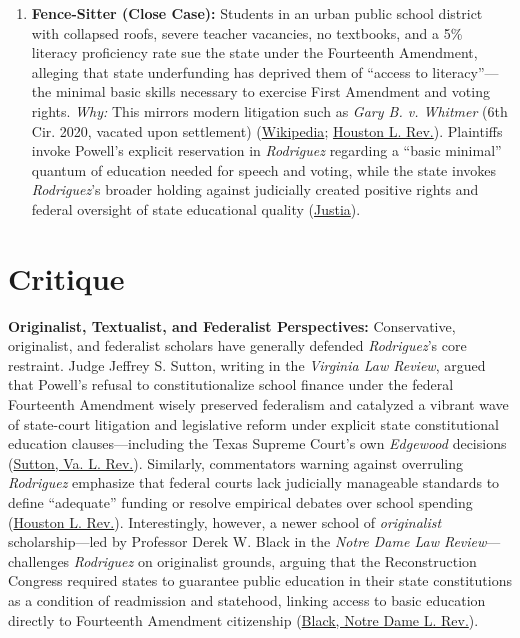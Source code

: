 \documentclass[12pt]{article}
\begin{document}
\begin{enumerate}
\item \textbf{Fence-Sitter (Close Case):} Students in an urban public school district with collapsed roofs, severe teacher vacancies, no textbooks, and a 5\% literacy proficiency rate sue the state under the Fourteenth Amendment, alleging that state underfunding has deprived them of ``access to literacy''---the minimal basic skills necessary to exercise First Amendment and voting rights. \emph{Why:} This mirrors modern litigation such as \textit{Gary B. v. Whitmer} (6th Cir. 2020, vacated upon settlement) (\href{https://en.wikipedia.org/wiki/San_Antonio_Independent_School_District_v._Rodriguez}{Wikipedia}; \href{https://houstonlawreview.org/article/18015-reversing-_rodriguez_-a-siren-call-to-a-dangerous-shoal}{Houston L. Rev.}). Plaintiffs invoke Powell's explicit reservation in \textit{Rodriguez} regarding a ``basic minimal'' quantum of education needed for speech and voting, while the state invokes \textit{Rodriguez}'s broader holding against judicially created positive rights and federal oversight of state educational quality (\href{https://supreme.justia.com/cases/federal/us/411/1/}{Justia}).
\end{enumerate}

\section{Critique}

\textbf{Originalist, Textualist, and Federalist Perspectives:} Conservative, originalist, and federalist scholars have generally defended \textit{Rodriguez}'s core restraint. Judge Jeffrey S. Sutton, writing in the \textit{Virginia Law Review}, argued that Powell's refusal to constitutionalize school finance under the federal Fourteenth Amendment wisely preserved federalism and catalyzed a vibrant wave of state-court litigation and legislative reform under explicit state constitutional education clauses---including the Texas Supreme Court's own \textit{Edgewood} decisions (\href{https://www.virginialawreview.org/wp-content/uploads/2020/12/1963-1.pdf}{Sutton, Va. L. Rev.}). Similarly, commentators warning against overruling \textit{Rodriguez} emphasize that federal courts lack judicially manageable standards to define ``adequate'' funding or resolve empirical debates over school spending (\href{https://houstonlawreview.org/article/18015-reversing-_rodriguez_-a-siren-call-to-a-dangerous-shoal}{Houston L. Rev.}). Interestingly, however, a newer school of \emph{originalist} scholarship---led by Professor Derek W. Black in the \textit{Notre Dame Law Review}---challenges \textit{Rodriguez} on originalist grounds, arguing that the Reconstruction Congress required states to guarantee public education in their state constitutions as a condition of readmission and statehood, linking access to basic education directly to Fourteenth Amendment citizenship (\href{https://ndlawreview.org/wp-content/uploads/2025/08/The-Fundamental-Right-to-Education.pdf}{Black, Notre Dame L. Rev.}).
\end{document}
